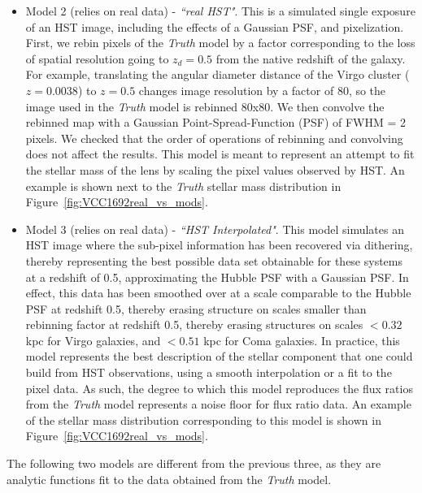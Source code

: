 \begin{itemize}
	\item Model 2 (relies on real data) - \textit{``real HST"}.  This is a simulated single exposure of an HST image, including the effects of a Gaussian PSF, and pixelization. First, we rebin pixels of the \textit{Truth} model by a factor corresponding to the loss of spatial resolution going to $z_d=0.5$ from the native redshift of the galaxy. For example, translating the angular diameter distance of the Virgo cluster ($z=0.0038$) to $z=0.5$ changes image resolution by a factor of 80, so the image used in the \textit{Truth} model is rebinned 80x80. We then convolve the rebinned map with a Gaussian Point-Spread-Function (PSF) of FWHM = 2 pixels. We checked that the order of operations of rebinning and convolving does not affect the results. This model is meant to represent an attempt to fit the stellar mass of the lens by scaling the pixel values observed by HST. An example is shown next to the \textit{Truth} stellar mass distribution in Figure~\ref{fig:VCC1692real_vs_mods}.
	
	\item Model 3 (relies on real data) - \textit{``HST Interpolated"}. This model simulates an HST image where the sub-pixel information has been recovered via dithering, thereby representing the best possible data set obtainable for these systems at a redshift of 0.5, approximating the Hubble PSF with a Gaussian PSF. In effect, this data has been smoothed over at a scale comparable to the Hubble PSF at redshift 0.5, thereby erasing structure on scales smaller than rebinning factor at redshift 0.5, thereby erasing structures on scales $<0.32$ kpc for Virgo galaxies, and $<0.51$ kpc for Coma galaxies. In practice, this model represents the best description of the stellar component that one could build from HST observations, using a smooth interpolation or a fit to the pixel data. As such, the degree to which this model reproduces the flux ratios from the \textit{Truth} model represents a noise floor for flux ratio data.  An example of the stellar mass distribution corresponding to this model is shown in Figure~\ref{fig:VCC1692real_vs_mods}.
\end{itemize}
The following two models are different from the previous three, as they are analytic functions fit to the data obtained from the \textit{Truth} model.
